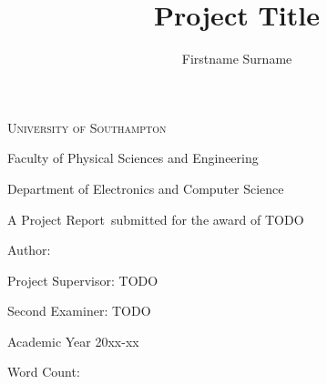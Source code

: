 \documentclass[a4paper]{article}
\author{Firstname Surname}
\title{Project Title}
\def \subtitle{Project Report}
\begin{document}
\makeatletter
\begin{titlepage}
    \centering
    {\scshape\huge University of Southampton \par}
    \vspace{0.3cm}
    {\LARGE Faculty of Physical Sciences and Engineering \par}
    \vspace{0.3cm}
    {\LARGE Department of Electronics and Computer Science \par}
    \vspace{4cm}
    {\huge\bfseries \@title \par}
    \vspace{4cm}
    {\LARGE A \subtitle \ submitted for the award of TODO \par}
    \vspace{3cm}
    {\centering\LARGE Author: \@author \par}
    \vspace{0.5cm}
    {\centering\Large Project Supervisor: TODO \par}
    {\centering\Large Second Examiner: TODO \par}
    \vspace{3cm}
    {\Large Academic Year 20xx-xx \par}
    \vspace{0.7cm}
    {Word Count: }
\end{titlepage}
\makeatother
\newpage


\newpage


\newpage

\tableofcontents
\newpage


\newpage


\newpage


\newpage


\newpage


\newpage

\newpage
{}
\printbibliography

\newpage
\begin{appendices}
  \addappheadtotoc

  

\end{appendices}
\end{document}
